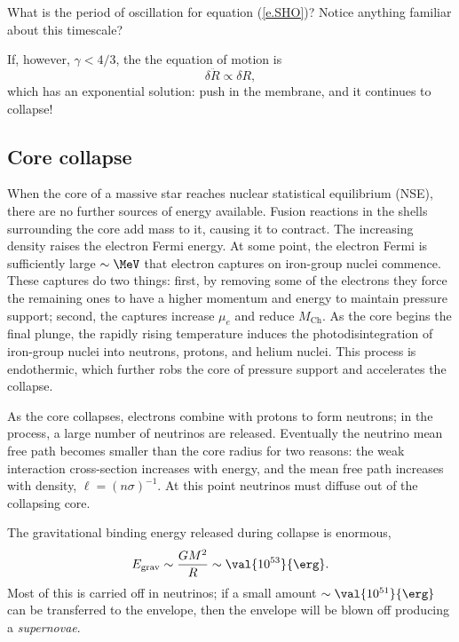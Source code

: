 \begin{exercisebox}
What is the period of oscillation for equation (\ref{e.SHO})?  Notice anything familiar about this timescale?
\end{exercisebox}

\noindent If, however, $\gamma < 4/3$, the the equation of motion is
\[ \delta\ddot{R} \propto \delta R, \]
which has an exponential solution: push in the membrane, and it continues to collapse!

\subsection{Core collapse}
When the core of a massive star reaches nuclear statistical equilibrium (NSE), there are no further sources of energy available. Fusion reactions in the shells surrounding the core add mass to it, causing it to contract.  The increasing density raises the electron Fermi energy.  At some point, the electron Fermi is sufficiently large $\sim\MeV$ that electron captures on iron-group nuclei commence.  These captures do two things: first, by removing some of the electrons they force the remaining ones to have a higher momentum and energy to maintain pressure support; second, the captures increase $\mu_{e}$ and reduce $M_{\mathrm{Ch}}$.  As the core begins the final plunge, the rapidly rising temperature induces the photodisintegration of iron-group nuclei into neutrons, protons, and helium nuclei.  This process is endothermic, which further robs the core of pressure support and accelerates the collapse.

As the core collapses, electrons combine with protons to form neutrons; in the process, a large number of neutrinos are released.  Eventually the neutrino mean free path becomes smaller than the core radius for two reasons: the weak interaction cross-section increases with energy, and the mean free path increases with density, $\ell = (n\sigma)^{-1}$.  At this point neutrinos must diffuse out of the collapsing core.

The gravitational binding energy released during collapse is enormous,
\[ E_{\mathrm{grav}} \sim \frac{GM^{2}}{R} \sim \val{10^{53}}{\erg}. \]
Most of this is carried off in neutrinos; if a small amount $\sim \val{10^{51}}{\erg}$ can be transferred to the envelope, then the envelope will be blown off producing a \emph{supernovae}.

